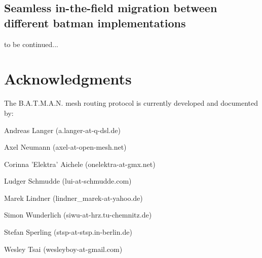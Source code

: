\documentclass[11pt]{article}
\begin{document}
\label{sec:howto-client}

\subsection{Seamless in-the-field migration between different batman implementations}

to be continued...


\section {Acknowledgments}
\label{sec:acks}

The B.A.T.M.A.N. mesh routing protocol is currently developed and documented by:

Andreas Langer (a.langer-at-q-dsl.de)

Axel Neumann (axel-at-open-mesh.net)

Corinna 'Elektra' Aichele (onelektra-at-gmx.net)

Ludger Schmudde (lui-at-schmudde.com)

Marek Lindner (lindner\_marek-at-yahoo.de)

Simon Wunderlich (siwu-at-hrz.tu-chemnitz.de)

Stefan Sperling (stsp-at-stsp.in-berlin.de)

Wesley Tsai (wesleyboy-at-gmail.com)









%
\end{document}
